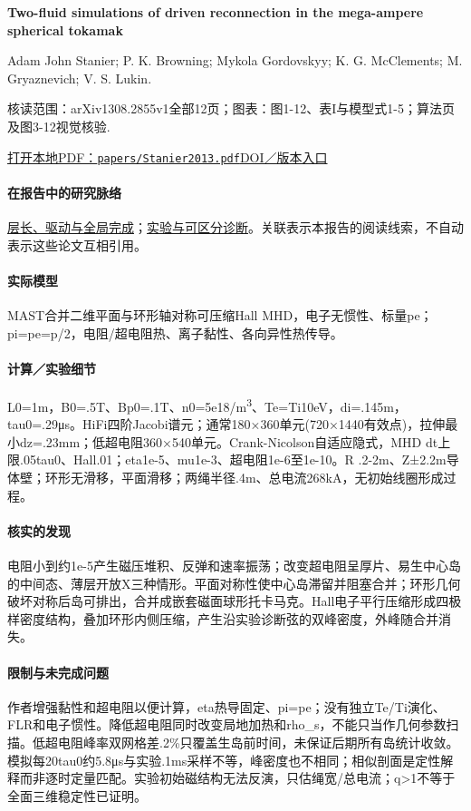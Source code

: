 \textbf{Two-fluid simulations of driven reconnection in the mega-ampere spherical tokamak}\citep{Stanier2013}\

Adam  John Stanier;  P. K. Browning;  Mykola Gordovskyy;  K. G. McClements;  M. Gryaznevich;  V. S. Lukin.

\textsf{核读范围：}arXiv1308.2855v1全部12页；\textsf{图表：}图1-12、表I与模型式1-5；算法页及图3-12视觉核验.

\href{run:papers/Stanier2013.pdf}{打开本地PDF：\texttt{papers/Stanier2013.pdf}}\quad\href{https://doi.org/10.1063/1.4830104}{DOI／版本入口}

\paragraph{在报告中的研究脉络}\hyperref[story:global]{层长、驱动与全局完成}；\hyperref[story:diagnostic]{实验与可区分诊断}。关联表示本报告的阅读线索，不自动表示这些论文互相引用。

\paragraph{实际模型}MAST合并二维平面与环形轴对称可压缩Hall MHD，电子无惯性、标量pe；pi=pe=p/2，电阻/超电阻热、离子黏性、各向异性热传导。

\paragraph{计算／实验细节}L0=1m，B0=.5T、Bp0=.1T、n0=5e18/m\textsuperscript{3}、Te=Ti10eV，di=.145m，tau0=.29μs。HiFi四阶Jacobi谱元；通常180×360单元(720×1440有效点)，拉伸最小dz=.23mm；低超电阻360×540单元。Crank-Nicolson自适应隐式，MHD dt上限.05tau0、Hall.01；eta1e-5、mu1e-3、超电阻1e-6至1e-10。R .2-2m、Z±2.2m导体壁；环形无滑移，平面滑移；两绳半径.4m、总电流268kA，无初始线圈形成过程。

\paragraph{核实的发现}电阻小到约1e-5产生磁压堆积、反弹和速率振荡；改变超电阻呈厚片、易生中心岛的中间态、薄层开放X三种情形。平面对称性使中心岛滞留并阻塞合并；环形几何破坏对称后岛可排出，合并成嵌套磁面球形托卡马克。Hall电子平行压缩形成四极样密度结构，叠加环形内侧压缩，产生沿实验诊断弦的双峰密度，外峰随合并消失。

\paragraph{限制与未完成问题}作者增强黏性和超电阻以便计算，eta热导固定、pi=pe；没有独立Te/Ti演化、FLR和电子惯性。降低超电阻同时改变局地加热和rho\_s，不能只当作几何参数扫描。低超电阻峰率双网格差.2\%只覆盖生岛前时间，未保证后期所有岛统计收敛。模拟每20tau0约5.8μs与实验.1ms采样不等，峰密度也不相同；相似剖面是定性解释而非逐时定量匹配。实验初始磁结构无法反演，只估绳宽/总电流；q>1不等于全面三维稳定性已证明。

